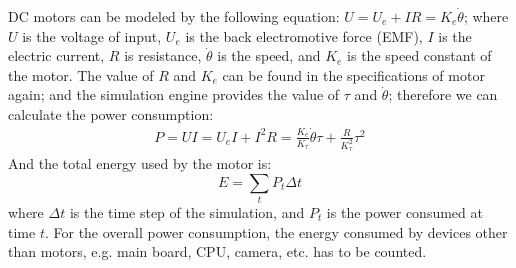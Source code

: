 \documentclass{llncs}
\newcommand{\inputtikz}[1]
{
  \StrSubstitute{#1}{/}{.}[\fn]
  \scancs{\filename}{\fn}
  \tikzsetfigurename{\filename}
  
}
\begin{document}
DC motors can be modeled by the following equation:
$U = U_e + IR \label{eq:u-ir} = K_e \dot{\theta} \label{eq:u-ke}$;
where $U$ is the voltage of input, $U_e$ is the back electromotive
force (EMF), $I$ is the electric current, $R$ is resistance,
$\dot{\theta}$ is the speed, and $K_e$ is the speed constant of the motor.
The value of $R$ and $K_e$ can be found in the specifications of motor again;
and the simulation engine provides
the value of $\tau$ and $\dot{\theta}$; therefore we can calculate the
power consumption:
\begin{align}
  P = UI = U_eI + I^2R = \frac{K_e}{K_\tau}\dot{\theta}\tau + \frac{R}{K_\tau^2}\tau^2
\end{align}
And the total energy used by the motor is:
\begin{equation}
  \label{eq:motor-power}
  E = \sum_t{P_t\Delta{}t}
\end{equation}
where $\Delta{}t$ is the time step of the simulation, and $P_t$ is the power consumed at time $t$. For the overall
power consumption, the energy consumed by devices other than motors,
e.g. main board, CPU, camera, etc. has to be counted.

\end{document}
